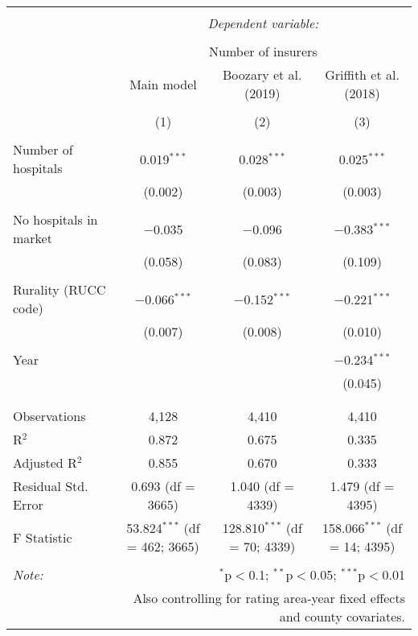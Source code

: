 
\begingroup 
\scriptsize 
\begin{tabular}{@{\extracolsep{5pt}}lccc} 
\\[-1.8ex]\hline 
\hline \\[-1.8ex] 
 & \multicolumn{3}{c}{\textit{Dependent variable:}} \\ 
\cline{2-4} 
\\[-1.8ex] & \multicolumn{3}{c}{Number of insurers} \\ 
 & Main model & Boozary et al. (2019) & Griffith et al. (2018) \\ 
\\[-1.8ex] & (1) & (2) & (3)\\ 
\hline \\[-1.8ex] 
 Number of hospitals & 0.019$^{***}$ & 0.028$^{***}$ & 0.025$^{***}$ \\ 
  & (0.002) & (0.003) & (0.003) \\ 
  & & & \\ 
 No hospitals in market & $-$0.035 & $-$0.096 & $-$0.383$^{***}$ \\ 
  & (0.058) & (0.083) & (0.109) \\ 
  & & & \\ 
 Rurality (RUCC code) & $-$0.066$^{***}$ & $-$0.152$^{***}$ & $-$0.221$^{***}$ \\ 
  & (0.007) & (0.008) & (0.010) \\ 
  & & & \\ 
 Year &  &  & $-$0.234$^{***}$ \\ 
  &  &  & (0.045) \\ 
  & & & \\ 
\hline \\[-1.8ex] 
Observations & 4,128 & 4,410 & 4,410 \\ 
R$^{2}$ & 0.872 & 0.675 & 0.335 \\ 
Adjusted R$^{2}$ & 0.855 & 0.670 & 0.333 \\ 
Residual Std. Error & 0.693 (df = 3665) & 1.040 (df = 4339) & 1.479 (df = 4395) \\ 
F Statistic & 53.824$^{***}$ (df = 462; 3665) & 128.810$^{***}$ (df = 70; 4339) & 158.066$^{***}$ (df = 14; 4395) \\ 
\hline 
\hline \\[-1.8ex] 
\textit{Note:}  & \multicolumn{3}{r}{$^{*}$p$<$0.1; $^{**}$p$<$0.05; $^{***}$p$<$0.01} \\ 
 & \multicolumn{3}{r}{Also controlling for rating area-year fixed effects and county covariates.} \\ 
\end{tabular} 
\endgroup 
